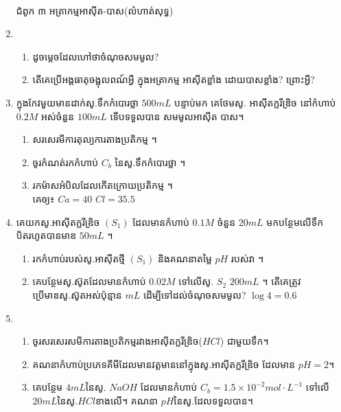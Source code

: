 \documentclass[12pt, a5paper]{article}
\begin{document}
\begin{enumerate}[m]
\begin{center}
		\sffamily\color{black}
		\\
		ជំពូក ៣ អត្រាកម្មអាស៊ីត-បាស(លំហាត់សុទ្ធ)
	\end{center}
	\item \begin{enumerate}[k]
		\item ដូចម្តេចដែលហៅថាចំណុចសមមូល?
		\item តើគេប្រើអង្គធាតុចង្អុលពណ៍អ្វី ក្នុងអត្រាកម្ម អាស៊ីតខ្លាំង ដោយបាសខ្លាំង? ព្រោះអ្វី?
	\end{enumerate}
	\item ក្នុងកែវមួយមានដាក់សូ.ទឹកកំបោរថ្លា $500mL$ បន្ទាប់មក គេថែមសូ. អាស៊ីតក្លរីឌ្រិច នៅកំហាប់ $0.2M$ អស់ចំនួន $100mL$ ទើបទទួលបាន សមមូលអាស៊ីត បាស។
	\begin{enumerate}[k]
		\item សរសេរមីការតុល្យការតាងប្រតិកម្ម ។
		\item ចូរកំណត់រកកំហាប់ $C_b$ នៃសូ.ទឹកកំបោរថ្លា ។
		\item រកម៉ាសអំបិលដែលកើតក្រោយប្រតិកម្ម ។\\
		គេឲ្យ៖ $Ca=40 $ $Cl=35.5$
	\end{enumerate}
	\item គេយកសូ.អាស៊ីតក្លរីឌ្រិច $(S_1)$ ដែលមានកំហាប់ $0.1M$ ចំនួន $20mL$ មកបន្ថែមលើទឹកបិតរហូតបានមាឌ $50mL$ ។
	\begin{enumerate}[k]
		\item រកកំហាប់របស់សូ.អាស៊ីតថ្មី $(S_1)$ និងគណនាតម្លៃ $pH$ របស់វា ។
		\item គេបន្ថែមសូ.ស៊ូតដែលមានកំហាប់ $0.02M$ ទៅលើសូ. $S_2$ $200mL$ ។ តើគេត្រូវប្រើមាឌសូ.ស៊ូតអស់ប៉ុន្មាន $mL$ ដើម្បីទៅដល់ចំណុចសមមូល? $\log4=0.6$
	\end{enumerate}
	\item \begin{enumerate}[k]
		\item ចូរសរសេរសមីការតាងប្រតិកម្មរវាងអាស៊ីតក្លរីឌ្រិច($HCl$) ជាមួយទឹក។
		\item គណនាកំហាប់ប្រភេទគីមីដែលមានវត្តមាននៅក្នុងសូ.អាស៊ីតក្លរីឌ្រិច ដែលមាន $pH=2$។
		\item គេបន្ថែម $4mL$នៃសូ. $NaOH$ ដែលមានកំហាប់ $C_b=1.5\times10^{-2}mol\cdot L^{-1}$ ទៅលើ $20mL$នៃសូ.$HCl$ខាងលើ។ គណនា $pH$នៃសូ.ដែលទទួលបាន។
	\end{enumerate}
	\begin{center}
		\sffamily\color{black}
		\\

\end{center}
\end{enumerate}
\end{document}
